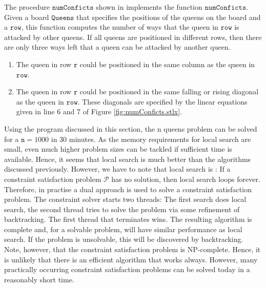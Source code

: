 The procedure $\texttt{numConficts}$ shown in  implements the function
$\texttt{numConficts}$.  Given a board $\texttt{Queens}$ that specifies the positions of the queens on the
board and a $\texttt{row}$, this function computes the number of ways that the queen in $\texttt{row}$ is
attacked by other queens.  If all queens are positioned in different rows, then there are only three ways left
that a queen can be attacked by another queen.
\begin{enumerate}
\item The queen in row $\texttt{r}$ could be positioned in the same column as the queen in $\texttt{row}$.
\item The queen in row $\texttt{r}$ could be positioned in the same falling or rising diagonal as the queen in
      $\texttt{row}$.  These diagonals are specified by the linear equations given in line 6 and 7 of Figure
      \ref{fig:numConficts.stlx}.
\end{enumerate}
Using the program discussed in this section, the n queens problem can be solved for a $\texttt{n} = 1000$ in
30 minutes.  As the memory requirements for local search are small, even much higher problem sizes can be
tackled if sufficient time is available.  Hence, it seems that local search is much better than the algorithms
discussed previously.  However, we have to note that local search is :  If a
constraint satisfaction problem $\mathcal{P}$ has no solution, then local search loops forever.  Therefore, in
practise a dual approach is used to solve a constraint satisfaction problem.  The constraint solver starts two
threads: The first search does local search, the second thread tries to solve the problem via some refinement
of backtracking.  The first thread that terminates wins.  The resulting algorithm is complete and, for a
solvable problem, will have similar performance as local search.  If the problem is unsolvable, this will
 be discovered by backtracking.  Note, however, that the constraint satisfaction
problem is NP-complete.  Hence, it is unlikely that there is an efficient algorithm that works always.
However, many practically occurring constraint satisfaction problems can be solved today in a reasonably short
time. 

